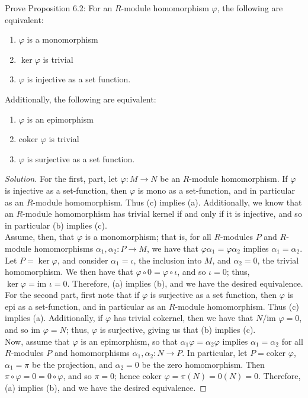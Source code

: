 \documentclass[12pt]{article}
\newenvironment{problem}[2][Problem]{\begin{trivlist}
\item[\hskip \labelsep {\bfseries #1}\hskip \labelsep {\bfseries #2.}]}{\end{trivlist}}
\newcommand{\im}{\text{im }}
\newcommand{\coker}{\text{coker }}
\newenvironment{solution}
  {\renewcommand\qedsymbol{$\blacksquare$}\begin{proof}[Solution]}
{\end{proof}}
\theoremstyle{remark}
\begin{document}
\begin{problem}{6.12}
  Prove Proposition 6.2:
  For an $R$-module homomorphism $\varphi$, the following are equivalent:
  \begin{enumerate}[label=(\alph*)]
    \item $\varphi$ is a monomorphism 
    \item $\ker\varphi$ is trivial
    \item $\varphi$ is injective as a set function.
  \end{enumerate}
  Additionally, the following are equivalent:
  \begin{enumerate}[label=(\alph*)]
    \item $\varphi$ is an epimorphism 
    \item $\coker\varphi$ is trivial
    \item $\varphi$ is surjective as a set function.
  \end{enumerate}
\end{problem}
\begin{solution}
  For the first, part, let $\varphi:M\to N$ be an $R$-module homomorphism.
  If $\varphi$ is injective as a set-function, then $\varphi$ is mono
  as a set-function, and in particular as an $R$-module homomorphism.
  Thus (c) implies (a).
  Additionally, we know that an $R$-module homomorphism has trivial kernel
  if and only if it is injective, and so in particular (b) implies (c).\\
  \indent Assume, then, that $\varphi$ is a monomorphism; that is,
  for all $R$-modules $P$ and $R$-module homomorphisms 
  $\alpha_1,\alpha_2:P\to M$, we have that $\varphi\alpha_1=\varphi\alpha_2$
  implies $\alpha_1=\alpha_2$.
  Let $P=\ker\varphi$, and consider $\alpha_1=\iota$, the inclusion into $M$,
  and $\alpha_2=0$, the trivial homomorphism.
  We then have that $\varphi\circ0 = \varphi\circ\iota$, and so
  $\iota=0$; thus, $\ker\varphi=\im\iota=0$.
  Therefore, (a) implies (b), and we have the desired equivalence.\\
  \indent For the second part, first note that if $\varphi$ is surjective
  as a set function, then $\varphi$ is epi as a set-function, and in 
  particular as an $R$-module homomorphism.
  Thus (c) implies (a).
  Additionally, if $\varphi$ has trivial cokernel, then we have that
  $N/\im\varphi=0$, and so $\im\varphi = N$; thus, $\varphi$ is surjective,
  giving us that (b) implies (c).\\
  \indent Now, assume that $\varphi$ is an epimorphism, so that
  $\alpha_1\varphi=\alpha_2\varphi$ implies $\alpha_1=\alpha_2$ for all
  $R$-modules $P$ and homomorphisms $\alpha_1,\alpha_2:N\to P$.
  In particular, let $P=\coker\varphi$, $\alpha_1=\pi$ be the projection,
  and $\alpha_2=0$ be the zero homomorphism.
  Then $\pi\circ\varphi=0=0\circ\varphi$, and so $\pi=0$; hence 
  $\coker\varphi=\pi(N)=0(N)=0$.
  Therefore, (a) implies (b), and we have the desired equivalence.
\end{solution}
\end{document}
